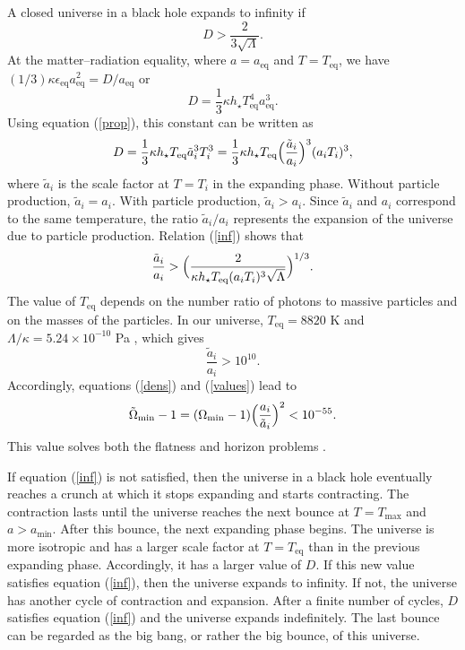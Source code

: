 \documentclass[prd,onecolumn,nofootinbib]{revtex4}
\begin{document}
A closed universe in a black hole expands to infinity if \cite{Lor}
\begin{equation}
D>\frac{2}{3\sqrt{\Lambda}}.
\label{inf}
\end{equation}
At the matter--radiation equality, where $a=a_\textrm{eq}$ and $T=T_\textrm{eq}$, we have $(1/3)\kappa\epsilon_\textrm{eq} a_\textrm{eq}^2=D/a_\textrm{eq}$ or
\begin{equation}
D=\frac{1}{3}\kappa h_\star T_\textrm{eq}^4 a_\textrm{eq}^3.
\end{equation}
Using equation (\ref{prop}), this constant can be written as
\begin{equation}
D=\frac{1}{3}\kappa h_\star T_\textrm{eq}\tilde{a}_i^3 T_i^3=\frac{1}{3}\kappa h_\star T_\textrm{eq}\Bigl(\frac{\tilde{a}_i}{a_i}\Bigr)^3(a_i T_i)^3,
\end{equation}
where $\tilde{a}_i$ is the scale factor at $T=T_i$ in the expanding phase.
Without particle production, $\tilde{a}_i=a_i$.
With particle production, $\tilde{a}_i>a_i$.
Since $\tilde{a}_i$ and $a_i$ correspond to the same temperature, the ratio $\tilde{a}_i/a_i$ represents the expansion of the universe due to particle production.
Relation (\ref{inf}) shows that
\begin{equation}
\frac{\tilde{a}_i}{a_i}>\Bigl(\frac{2}{\kappa h_\star T_\textrm{eq}(a_i T_i)^3\sqrt{\Lambda}}\Bigr)^{1/3}.
\end{equation}
The value of $T_\textrm{eq}$ depends on the number ratio of photons to massive particles and on the masses of the particles.
In our universe, $T_\textrm{eq}=8820$ K and $\Lambda/\kappa=5.24\times 10^{-10}$ Pa \cite{Ric}, which gives
\begin{equation}
\frac{\tilde{a}_i}{a_i}>10^{10}.
\label{cond}
\end{equation}
Accordingly, equations (\ref{dens}) and (\ref{values}) lead to
\begin{equation}
\tilde{\Omega}_\textrm{min}-1=(\Omega_\textrm{min}-1)\Bigl(\frac{a_i}{\tilde{a}_i}\Bigr)^2<10^{-55}.
\end{equation}
This value solves both the flatness and horizon problems \cite{torsion1}.

If equation (\ref{inf}) is not satisfied, then the universe in a black hole eventually reaches a crunch at which it stops expanding and starts contracting.
The contraction lasts until the universe reaches the next bounce at $T=T_\textrm{max}$ and $a>a_\textrm{min}$.
After this bounce, the next expanding phase begins.
The universe is more isotropic and has a larger scale factor at $T=T_\textrm{eq}$ than in the previous expanding phase.
Accordingly, it has a larger value of $D$.
If this new value satisfies equation (\ref{inf}), then the universe expands to infinity.
If not, the universe has another cycle of contraction and expansion.
After a finite number of cycles, $D$ satisfies equation (\ref{inf}) and the universe expands indefinitely.
The last bounce can be regarded as the big bang, or rather the big bounce, of this universe.
\end{document}

